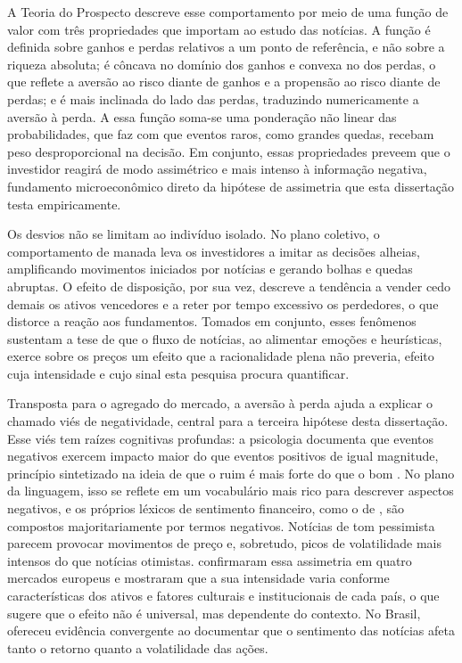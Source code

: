 A Teoria do Prospecto descreve esse comportamento por meio de uma função de valor com três propriedades que importam ao estudo das notícias. A função é definida sobre ganhos e perdas relativos a um ponto de referência, e não sobre a riqueza absoluta; é côncava no domínio dos ganhos e convexa no dos perdas, o que reflete a aversão ao risco diante de ganhos e a propensão ao risco diante de perdas; e é mais inclinada do lado das perdas, traduzindo numericamente a aversão à perda. A essa função soma-se uma ponderação não linear das probabilidades, que faz com que eventos raros, como grandes quedas, recebam peso desproporcional na decisão. Em conjunto, essas propriedades preveem que o investidor reagirá de modo assimétrico e mais intenso à informação negativa, fundamento microeconômico direto da hipótese de assimetria que esta dissertação testa empiricamente.

Os desvios não se limitam ao indivíduo isolado. No plano coletivo, o comportamento de manada leva os investidores a imitar as decisões alheias, amplificando movimentos iniciados por notícias e gerando bolhas e quedas abruptas. O efeito de disposição, por sua vez, descreve a tendência a vender cedo demais os ativos vencedores e a reter por tempo excessivo os perdedores, o que distorce a reação aos fundamentos. Tomados em conjunto, esses fenômenos sustentam a tese de que o fluxo de notícias, ao alimentar emoções e heurísticas, exerce sobre os preços um efeito que a racionalidade plena não preveria, efeito cuja intensidade e cujo sinal esta pesquisa procura quantificar.

Transposta para o agregado do mercado, a aversão à perda ajuda a explicar o chamado viés de negatividade, central para a terceira hipótese desta dissertação. Esse viés tem raízes cognitivas profundas: a psicologia documenta que eventos negativos exercem impacto maior do que eventos positivos de igual magnitude, princípio sintetizado na ideia de que o ruim é mais forte do que o bom \cite{baumeister_bad_2001, rozin_negativity_2001}. No plano da linguagem, isso se reflete em um vocabulário mais rico para descrever aspectos negativos, e os próprios léxicos de sentimento financeiro, como o de , são compostos majoritariamente por termos negativos. Notícias de tom pessimista parecem provocar movimentos de preço e, sobretudo, picos de volatilidade mais intensos do que notícias otimistas.  confirmaram essa assimetria em quatro mercados europeus e mostraram que a sua intensidade varia conforme características dos ativos e fatores culturais e institucionais de cada país, o que sugere que o efeito não é universal, mas dependente do contexto. No Brasil,  ofereceu evidência convergente ao documentar que o sentimento das notícias afeta tanto o retorno quanto a volatilidade das ações.

